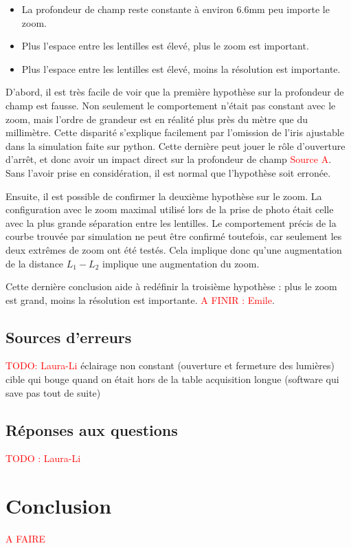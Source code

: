 \documentclass[11pt,letterpaper]{article}
\begin{document}
\begin{itemize}
\item La profondeur de champ reste constante à environ 6.6mm peu importe le zoom.
\item Plus l'espace entre les lentilles est élevé, plus le zoom est important.
\item Plus l'espace entre les lentilles est élevé, moins la résolution est importante.
\end{itemize}

D'abord, il est très facile de voir que la première hypothèse sur la profondeur
de champ est fausse. Non seulement le comportement n'était pas constant avec le zoom,
mais l'ordre de grandeur est en réalité plus près du mètre que du millimètre. Cette
disparité s'explique facilement par l'omission de l'iris ajustable dans la simulation
faite sur python. Cette dernière peut jouer le rôle d'ouverture d'arrêt, et donc avoir
un impact direct sur la profondeur de champ \textcolor{red}{Source A}. Sans l'avoir 
prise en considération, il est normal que l'hypothèse soit erronée.


Ensuite, il est possible de confirmer la deuxième hypothèse sur le zoom. La
configuration avec le zoom maximal utilisé lors de la prise de photo était celle avec
la plus grande séparation entre les lentilles. Le comportement précis de la courbe
trouvée par simulation ne peut être confirmé toutefois, car seulement les deux extrêmes
de zoom ont été testés. Cela implique donc qu'une augmentation de la distance $L_1 - L_2$ implique une augmentation du zoom.

Cette dernière conclusion aide à redéfinir la troisième hypothèse : plus le zoom est
grand, moins la résolution est importante. \textcolor{red}{A FINIR : Emile}.

\subsection{Sources d'erreurs}

\textcolor{red}{TODO: Laura-Li}
éclairage non constant (ouverture et fermeture des lumières)
cible qui bouge quand on était hors de la table
acquisition longue (software qui save pas tout de suite)

\subsection{Réponses aux questions}

\textcolor{red}{TODO : Laura-Li}

\section{Conclusion}

\textcolor{red}{A FAIRE}

\clearpage

% 
% 
\end{document}
